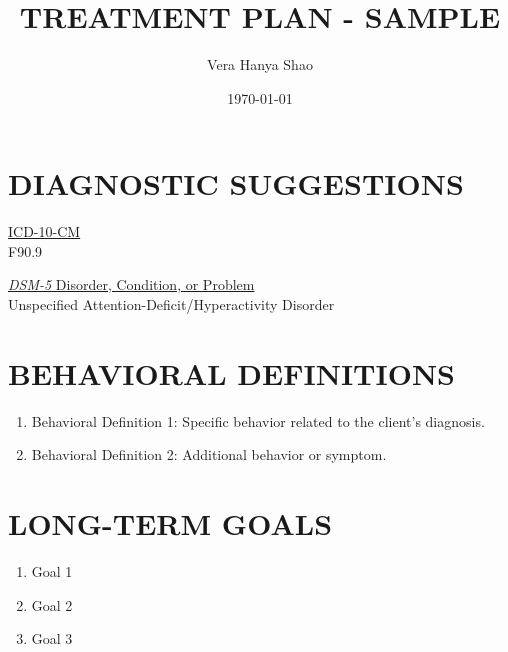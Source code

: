 \documentclass{article}
\title{\textsf{\textbf{TREATMENT PLAN - SAMPLE}}}
\author{Vera Hanya Shao}
\date{\today}
\begin{document}
\maketitle

\section*{\textsf{\textbf{DIAGNOSTIC SUGGESTIONS}}}
\begin{multicols}{2}
\parbox{0.3\textwidth}{
    \underline{ICD-10-CM} \\
    F90.9
}
\columnbreak
\parbox{0.7\textwidth}{\raggedright
    \underline{\textit{DSM-5} Disorder, Condition, or Problem} \\
    Unspecified Attention-Deficit/Hyperactivity Disorder
}
\end{multicols}




\section*{\textsf{\textbf{BEHAVIORAL DEFINITIONS}}}
\begin{enumerate}[itemsep=0em, parsep=0em]
    \item Behavioral Definition 1: Specific behavior related to the client's diagnosis.
    \item Behavioral Definition 2: Additional behavior or symptom.
\end{enumerate}





\section*{\textsf{\textbf{LONG-TERM GOALS}}}
\begin{enumerate}[itemsep=0em, parsep=0em]
    \item Goal 1
    \item Goal 2
    \item Goal 3
\end{enumerate}




\end{document}
